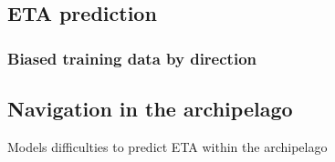 \documentclass[../main.tex]{subfiles}
\begin{document}
\subsection{ETA prediction}

\subsubsection{Biased training data by direction}

\subsection{Navigation in the archipelago}

Models difficulties to predict ETA within the archipelago
\end{document}
